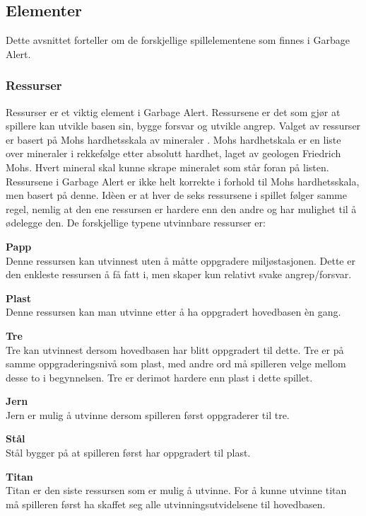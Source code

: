 

\subsection{Elementer}
Dette avsnittet forteller om de forskjellige spillelementene som finnes
i Garbage Alert.
\subsubsection{Ressurser}
Ressurser er et viktig element i Garbage Alert. Ressursene er det som
gjør at spillere kan utvikle basen sin, bygge forsvar og utvikle angrep.
Valget av ressurser er basert på Mohs hardhetsskala av mineraler \cite{mohs}. Mohs hardhetskala er en liste over mineraler i rekkefølge etter absolutt hardhet, laget av geologen Friedrich Mohs. Hvert mineral skal kunne skrape mineralet som står foran på listen. Ressursene i Garbage Alert er ikke helt korrekte i forhold til Mohs hardhetsskala, men basert på denne. Idèen er at hver de seks ressursene i spillet følger samme regel, nemlig at den ene ressursen er hardere enn den andre og har mulighet til å ødelegge den. 
De forskjellige typene utvinnbare ressurser er:
\begin{description}
	\item \textbf{Papp}\\ Denne ressursen kan utvinnest uten å måtte
oppgradere miljøstasjonen. Dette er den enkleste ressursen å få fatt i,
men skaper kun relativt svake angrep/forsvar.
	\item \textbf{Plast}\\ Denne ressursen kan man utvinne etter å ha
oppgradert hovedbasen èn gang.
	\item \textbf{Tre}\\ Tre kan utvinnest dersom hovedbasen har blitt
oppgradert til dette. Tre er på samme oppgraderingsnivå som plast, med andre ord må
spilleren velge mellom desse to i begynnelsen. Tre er derimot hardere enn plast i dette spillet.
	\item \textbf{Jern}\\ Jern er mulig å utvinne dersom spilleren først
oppgraderer til tre.
	\item \textbf{Stål}\\ Stål bygger på at spilleren først har
oppgradert til plast.
	\item \textbf{Titan}\\ Titan er den siste ressursen som er mulig å
utvinne. For å kunne utvinne titan må spilleren først ha skaffet seg
alle utvinningsutvidelsene til hovedbasen.
\end{description}


